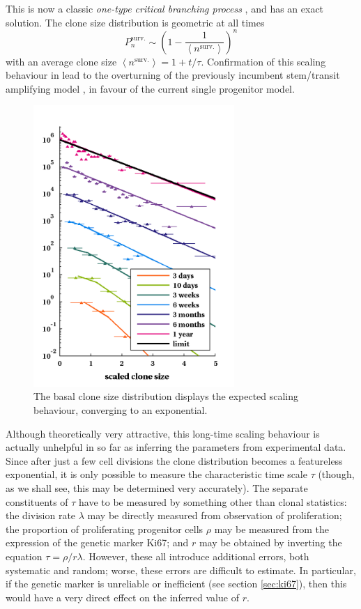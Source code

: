 \documentclass[10pt,english]{report}
\begin{document}
This is now a classic \emph{one-type critical branching process} \citep{athreya&ney}, and has an exact solution. The clone size distribution is geometric at all times $$P^\textrm{surv.}_n \sim \left(1-\frac{1}{\left\langle n^\textrm{surv.} \right\rangle}\right)^n$$ with an average clone size $\left\langle n^\textrm{surv.} \right\rangle = 1 + t/\tau$. Confirmation of this scaling behaviour in \citet{clayton} lead to the overturning of the previously incumbent stem/transit amplifying model \citep{stemta1,stemta2,stemta3}, in favour of the current single progenitor model.

\begin{figure}[htb]
	\centering
	\includegraphics[width=3in]{oes-scaling-b.png}
	\caption{The basal clone size distribution displays the expected scaling behaviour, converging to an exponential.}
\end{figure}


Although theoretically very attractive, this long-time scaling behaviour is actually unhelpful in so far as inferring the parameters from experimental data. Since after just a few cell divisions the clone distribution becomes a featureless exponential, it is only possible to measure the characteristic time scale $\tau$ (though, as we shall see, this may be determined very accurately). The separate constituents of $\tau$ have to be measured by something other than clonal statistics: the division rate $\lambda$ may be directly measured from observation of proliferation; the proportion of proliferating progenitor cells $\rho$ may be measured from the expression of the genetic marker Ki67; and $r$ may be obtained by inverting the equation $\tau = \rho/r\lambda$. However, these all introduce additional errors, both systematic and random; worse, these errors are difficult to estimate. In particular, if the genetic marker is unreliable or inefficient (see section \ref{sec:ki67}), then this would have a very direct effect on the inferred value of $r$.
\end{document}
